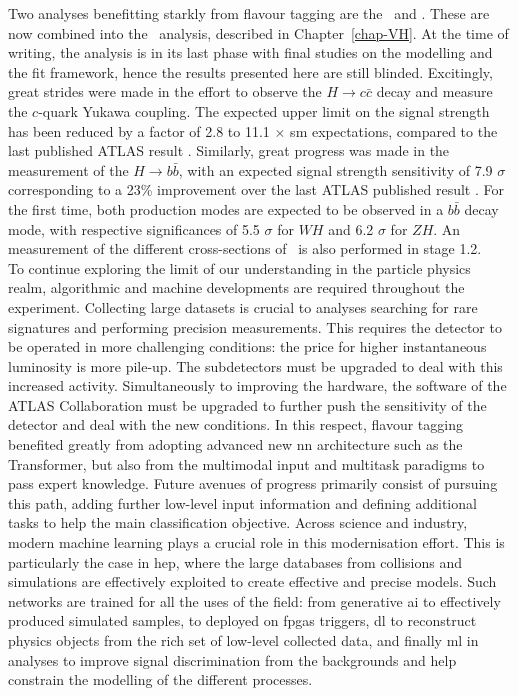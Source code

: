 Two analyses benefitting starkly from flavour tagging are the \vhb\ and \vhc. These are now combined into the \vhbc\ analysis, described in Chapter~\ref{chap-VH}. At the time of writing, the analysis is in its last phase with final studies on the modelling and the fit framework, hence the results presented here are still blinded. Excitingly, great strides were made in the effort to observe the $H \rightarrow c\bar{c}$ decay and measure the $c$-quark Yukawa coupling. The expected upper limit on the signal strength has been reduced by a factor of 2.8 to 11.1 $\times$ \gls{sm} expectations, compared to the last published ATLAS result \cite{Collaboration:2721696}. Similarly, great progress was made in the measurement of the $H \rightarrow b\bar{b}$, with an expected signal strength sensitivity of 7.9 $\sigma$ corresponding to a 23\% improvement over the last ATLAS published result \cite{ATLAS:2021wqh}. For the first time, both production modes are expected to be observed in a $b\bar{b}$ decay mode, with respective significances of 5.5 $\sigma$ for $WH$ and 6.2 $\sigma$ for $ZH$. An  measurement of the different cross-sections of \vhb\ is also performed in stage 1.2.\\

To continue exploring the limit of our understanding in the particle physics realm, algorithmic and machine developments are required throughout the experiment. Collecting large datasets is crucial to analyses searching for rare signatures and performing precision measurements. This requires the detector to be operated in more challenging conditions: the price for higher instantaneous luminosity is more pile-up. The subdetectors must be upgraded to deal with this increased activity. Simultaneously to improving the hardware, the software of the ATLAS Collaboration must be upgraded to further push the sensitivity of the detector and deal with the new conditions. In this respect, flavour tagging benefited greatly from adopting advanced new \gls{nn} architecture such as the Transformer, but also from the multimodal input and multitask paradigms to pass expert knowledge. Future avenues of progress primarily consist of pursuing this path, adding further low-level input information and defining additional tasks to help the main classification objective. Across science and industry, modern machine learning plays a crucial role in this modernisation effort. This is particularly the case in \gls{hep}, where the large databases from collisions and simulations are effectively exploited to create effective and precise models. Such networks are trained for all the uses of the field: from generative \gls{ai} to effectively produced simulated samples, to deployed on \glspl{fpga} triggers, \gls{dl} to reconstruct physics objects from the rich set of low-level collected data, and finally \gls{ml} in analyses to improve signal discrimination from the backgrounds and help constrain the modelling of the different processes. 